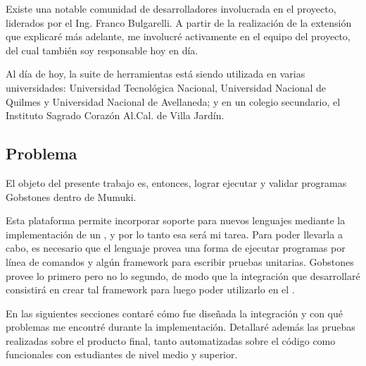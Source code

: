 Existe una notable comunidad de desarrolladores involucrada en el proyecto, liderados por el Ing. Franco Bulgarelli. A partir de la realización de la extensión que explicaré más adelante, me involucré activamente en el equipo del proyecto, del cual también soy responsable hoy en día.

Al día de hoy, la suite de herramientas está siendo utilizada en varias universidades: Universidad Tecnológica Nacional, Universidad Nacional de Quilmes y Universidad Nacional de Avellaneda; y en un colegio secundario, el Instituto Sagrado Corazón Al.Cal. de Villa Jardín.

\subsection{Problema}
El objeto del presente trabajo es, entonces, lograr ejecutar y validar programas Gobstones dentro de Mumuki.

Esta plataforma permite incorporar soporte para nuevos lenguajes mediante la implementación de un \runner, y por lo tanto esa será mi tarea. Para poder llevarla a cabo, es necesario que el lenguaje provea una forma de ejecutar programas por línea de comandos y algún framework para escribir pruebas unitarias. Gobstones provee lo primero pero no lo segundo, de modo que la integración que desarrollaré consistirá en crear tal framework para luego poder utilizarlo en el \runner.

En las siguientes secciones contaré cómo fue diseñada la integración y con qué problemas me encontré durante la implementación. Detallaré además las pruebas realizadas sobre el producto final, tanto automatizadas sobre el código como funcionales con estudiantes de nivel medio y superior.
